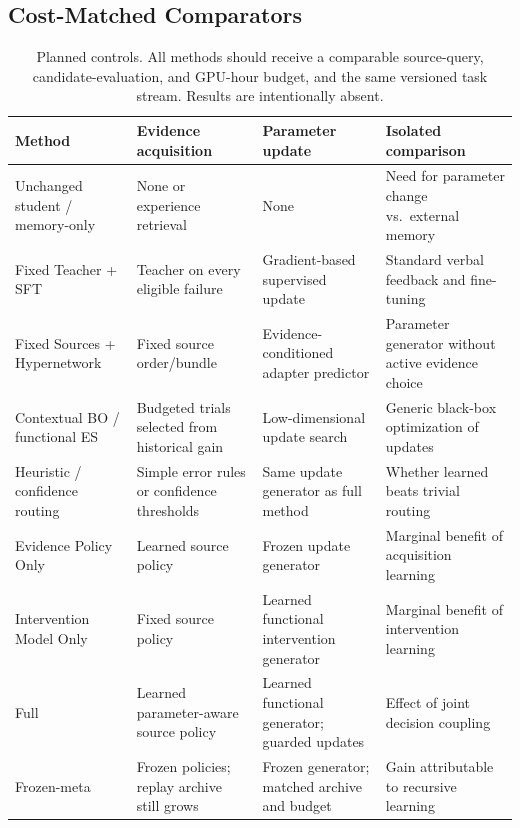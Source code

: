 \subsection{Cost-Matched Comparators}
\label{sec:baselines}
\begin{table}[t]
\centering
\small
\setlength{\tabcolsep}{5pt}
\begin{tabular}{p{3.3cm}p{4.2cm}p{4.0cm}p{4.2cm}}
\toprule
\textbf{Method} & \textbf{Evidence acquisition} &
\textbf{Parameter update} & \textbf{Isolated comparison}\\
\midrule
Unchanged student / memory-only &
None or experience retrieval &
None & Need for parameter change vs.\ external memory\\
Fixed Teacher + SFT &
Teacher on every eligible failure &
Gradient-based supervised update &
Standard verbal feedback and fine-tuning\\
Fixed Sources + Hypernetwork &
Fixed source order/bundle &
Evidence-conditioned adapter predictor &
Parameter generator without active evidence choice\\
Contextual BO / functional ES &
Budgeted trials selected from historical gain &
Low-dimensional update search &
Generic black-box optimization of updates\\
Heuristic / confidence routing &
Simple error rules or confidence thresholds &
Same update generator as full method &
Whether learned \pivoi{} beats trivial routing\\
Evidence Policy Only &
Learned source policy &
Frozen update generator &
Marginal benefit of acquisition learning\\
Intervention Model Only &
Fixed source policy &
Learned functional intervention generator &
Marginal benefit of intervention learning\\
Full \spear{} &
Learned parameter-aware source policy &
Learned functional generator; guarded updates &
Effect of joint decision coupling\\
Frozen-meta \spear{} &
Frozen policies; replay archive still grows &
Frozen generator; matched archive and budget &
Gain attributable to recursive learning\\
\bottomrule
\end{tabular}
\caption{Planned controls. All methods should receive a comparable
source-query, candidate-evaluation, and GPU-hour budget, and
the same versioned task stream. Results are intentionally absent.}
\label{tab:baselines}
\end{table}

